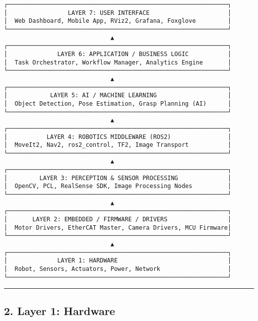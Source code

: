 \documentclass[
]{article}
\begin{document}
\begin{verbatim}
┌──────────────────────────────────────────────────────────────┐
│                 LAYER 7: USER INTERFACE                      │
│  Web Dashboard, Mobile App, RViz2, Grafana, Foxglove         │
└──────────────────────────────────────────────────────────────┘
                              ▲
┌──────────────────────────────────────────────────────────────┐
│              LAYER 6: APPLICATION / BUSINESS LOGIC           │
│  Task Orchestrator, Workflow Manager, Analytics Engine       │
└──────────────────────────────────────────────────────────────┘
                              ▲
┌──────────────────────────────────────────────────────────────┐
│            LAYER 5: AI / MACHINE LEARNING                    │
│  Object Detection, Pose Estimation, Grasp Planning (AI)      │
└──────────────────────────────────────────────────────────────┘
                              ▲
┌──────────────────────────────────────────────────────────────┐
│           LAYER 4: ROBOTICS MIDDLEWARE (ROS2)                │
│  MoveIt2, Nav2, ros2_control, TF2, Image Transport           │
└──────────────────────────────────────────────────────────────┘
                              ▲
┌──────────────────────────────────────────────────────────────┐
│         LAYER 3: PERCEPTION & SENSOR PROCESSING              │
│  OpenCV, PCL, RealSense SDK, Image Processing Nodes          │
└──────────────────────────────────────────────────────────────┘
                              ▲
┌──────────────────────────────────────────────────────────────┐
│       LAYER 2: EMBEDDED / FIRMWARE / DRIVERS                 │
│  Motor Drivers, EtherCAT Master, Camera Drivers, MCU Firmware│
└──────────────────────────────────────────────────────────────┘
                              ▲
┌──────────────────────────────────────────────────────────────┐
│              LAYER 1: HARDWARE                               │
│  Robot, Sensors, Actuators, Power, Network                   │
└──────────────────────────────────────────────────────────────┘
\end{verbatim}

\begin{center}\rule{0.5\linewidth}{0.5pt}\end{center}

\hypertarget{layer-1-hardware}{%
\subsection{2. Layer 1: Hardware}\label{layer-1-hardware}}
\end{document}
